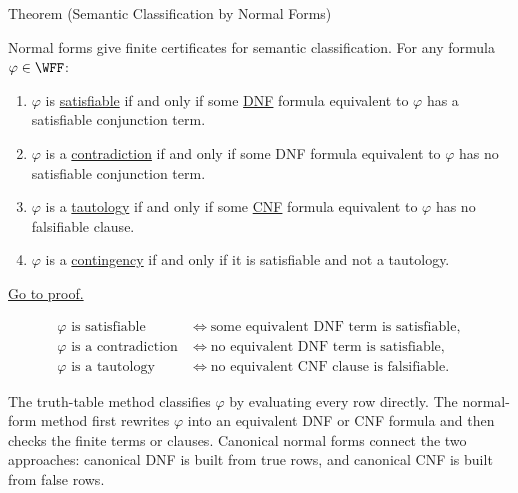 \begin{theorembox}{Theorem (Semantic Classification by Normal Forms)}
\begin{theorem}
\label{thm:normal-form-semantic-classification-propositional-logic}
Normal forms give finite certificates for semantic classification. For any
formula \(\varphi\in\WFF\):
\begin{enumerate}
  \item \(\varphi\) is
  \hyperref[def:satisfiable-formula-propositional-logic]{satisfiable} if and
  only if some
  \hyperref[def:disjunctive-normal-form-propositional-logic]{DNF} formula
  equivalent to \(\varphi\) has a satisfiable conjunction term.
  \item \(\varphi\) is a
  \hyperref[def:contradiction-propositional-logic]{contradiction} if and only
  if some DNF formula equivalent to \(\varphi\) has no satisfiable conjunction
  term.
  \item \(\varphi\) is a
  \hyperref[def:tautology-propositional-logic]{tautology} if and only if some
  \hyperref[def:conjunctive-normal-form-propositional-logic]{CNF} formula
  equivalent to \(\varphi\) has no falsifiable clause.
  \item \(\varphi\) is a
  \hyperref[def:contingency-propositional-logic]{contingency} if and only if it
  is satisfiable and not a tautology.
\end{enumerate}
\noindent\hyperref[prf:normal-form-semantic-classification-propositional-logic]{Go to proof.}
\end{theorem}
\end{theorembox}

\begin{remark*}
\[
\begin{aligned}
\varphi\text{ is satisfiable}
&\Longleftrightarrow
\text{some equivalent DNF term is satisfiable},\\
\varphi\text{ is a contradiction}
&\Longleftrightarrow
\text{no equivalent DNF term is satisfiable},\\
\varphi\text{ is a tautology}
&\Longleftrightarrow
\text{no equivalent CNF clause is falsifiable}.
\end{aligned}
\]
\end{remark*}

\begin{remark*}[Interpretation]
The truth-table method classifies \(\varphi\) by evaluating every row directly.
The normal-form method first rewrites \(\varphi\) into an equivalent DNF or CNF
formula and then checks the finite terms or clauses. Canonical normal forms
connect the two approaches: canonical DNF is built from true rows, and
canonical CNF is built from false rows.
\end{remark*}

